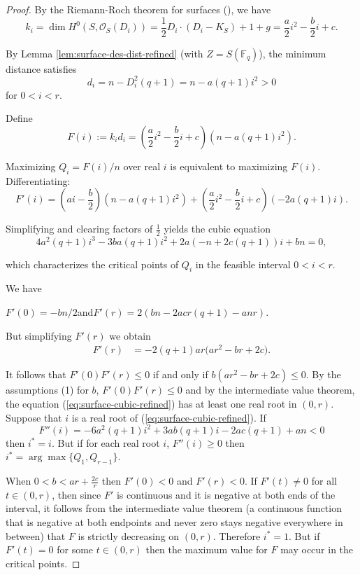 \documentclass[14pt]{amsart}
\theoremstyle{plain}
\theoremstyle{definition}
\theoremstyle{remark}
\theoremstyle{example}
\begin{document}
\begin{proof}
By the Riemann-Roch theorem for surfaces (\cite[p. 362]{Ha}), we have
\[
k_i = \dim H^0(S, \mathcal{O}_S(D_i)) = \frac{1}{2} D_i \cdot (D_i - K_S) + 1 + g 
= \frac{a}{2} i^2 - \frac{b}{2} i + c.
\]

By Lemma \ref{lem:surface-des-dist-refined} (with $Z = S(\mathbb{F}_q)$), the minimum distance satisfies
\[
d_i = n - D_i^2 (q+1) = n - a(q+1) i^2 > 0
\]
for $0<i <r$.

Define
\[
F(i) := k_i d_i = \left( \frac{a}{2} i^2 - \frac{b}{2} i + c \right) \left( n - a(q+1) i^2 \right).
\]

Maximizing $Q_i= F(i)/n$ over real $i$ is equivalent to maximizing $F(i)$. Differentiating:
\[
F'(i) = \left( a i - \frac{b}{2} \right) \left( n - a(q+1) i^2 \right) + \left( \frac{a}{2} i^2 - \frac{b}{2} i + c \right)( -2 a (q+1) i ).
\]

Simplifying and clearing factors of $\tfrac12$ yields the cubic equation
$$
4 a^2 (q+1) i^3 - 3 b a (q+1) i^2 + 2 a (-n + 2c(q+1)) i + b n = 0,
$$

which characterizes the critical points of $Q_i$ in the feasible interval $0<i<r$. 

We have 
\begin{center}
$F'(0)=-bn/2$\quad and\quad $F'(r)=2(bn-2acr(q+1)-anr)$.
\end{center}
But simplifying $F'(r)$ we obtain
\begin{align*}
F'(r) %
&=-2(q+1)ar\big(ar^2-br+2c\big).
\end{align*}


It follows that $F'(0)F'(r)\leq 0$ if and only if $b(ar^2-br+2c)\leq 0$. By the assumptions (1) for $b$, $F'(0)F'(r)\leq 0$ and by the intermediate value theorem, the equation (\ref{eq:surface-cubic-refined}) has at least one real root in $(0,r)$. Suppose that $i$ is a real root of (\ref{eq:surface-cubic-refined}). If $$F''(i)=-6a^2(q+1)i^2+3ab(q+1)i-2ac(q+1)+an<0$$ then $i^*=i.$ But if for each real root $i$, $F''(i)\geq 0$ then $i^*= \arg \max\{Q_1,Q_{r-1}\}.$

When $0< b< ar+\frac{2c}{r}$ then $F'(0)<0$ and $F'(r)<0$. If $F'(t)\neq 0$ for all $t\in (0,r)$, then since $F'$ is continuous and it is negative at both ends of the interval, it follows from the intermediate value theorem (a continuous function that is negative at both endpoints and never zero stays negative everywhere in between) that $F$ is strictly decreasing on $(0,r)$. Therefore $i^*=1$. But if $F'(t)=0$ for some $t\in (0,r)$ then the maximum value for $F$ may occur in the critical points.
\end{proof}
\end{document}
